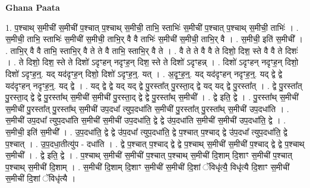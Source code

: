 \documentclass[17pt]{extarticle}
\begin{document}
\textbf{Ghana Paata } \newline

1. प॒श्चाथ् स॒मीची॑ स॒मीची॑ प॒श्चात् प॒श्चाथ् स॒मीची॒ ताभि॒ स्ताभिः॑ स॒मीची॑ प॒श्चात् प॒श्चाथ् स॒मीची॒ ताभिः॑ । . स॒मीची॒ ताभि॒ स्ताभिः॑ स॒मीची॑ स॒मीची॒ ताभि॒र् वै वै ताभिः॑ स॒मीची॑ स॒मीची॒ ताभि॒र् वै । . स॒मीची॒ इति॑ स॒मीची᳚ । . ताभि॒र् वै वै ताभि॒ स्ताभि॒र् वै ते ते वै ताभि॒ स्ताभि॒र् वै ते । . वै ते ते वै वै ते दिशो॒ दिश॒ स्ते वै वै ते दिशः॑ । . ते दिशो॒ दिश॒ स्ते ते दिशो॑ ऽदृꣳहन् नदृꣳह॒न् दिश॒ स्ते ते दिशो॑ ऽदृꣳहन्न् । . दिशो॑ ऽदृꣳहन् नदृꣳह॒न् दिशो॒ दिशो॑ ऽदृꣳह॒न्॒. यद् यद॑दृꣳह॒न् दिशो॒ दिशो॑ ऽदृꣳह॒न्॒. यत् । . अ॒दृꣳ॒॒ह॒न्॒. यद् यद॑दृꣳहन् नदृꣳह॒न्॒. यद् द्वे द्वे यद॑दृꣳहन् नदृꣳह॒न्॒. यद् द्वे । . यद् द्वे द्वे यद् यद् द्वे पु॒रस्ता᳚त् पु॒रस्ता॒द् द्वे यद् यद् द्वे पु॒रस्ता᳚त् । . द्वे पु॒रस्ता᳚त् पु॒रस्ता॒द् द्वे द्वे पु॒रस्ता᳚थ् स॒मीची॑ स॒मीची॑ पु॒रस्ता॒द् द्वे द्वे पु॒रस्ता᳚थ् स॒मीची᳚ । . द्वे इति॒ द्वे । . पु॒रस्ता᳚थ् स॒मीची॑ स॒मीची॑ पु॒रस्ता᳚त् पु॒रस्ता᳚थ् स॒मीची॑ उप॒दधा᳚ त्युप॒दधा॑ति स॒मीची॑ पु॒रस्ता᳚त् पु॒रस्ता᳚थ् स॒मीची॑ उप॒दधा॑ति । . स॒मीची॑ उप॒दधा᳚ त्युप॒दधा॑ति स॒मीची॑ स॒मीची॑ उप॒दधा॑ति॒ द्वे द्वे उ॑प॒दधा॑ति स॒मीची॑ स॒मीची॑ उप॒दधा॑ति॒ द्वे । . स॒मीची॒ इति॑ स॒मीची᳚ । . उ॒प॒दधा॑ति॒ द्वे द्वे उ॑प॒दधा᳚ त्युप॒दधा॑ति॒ द्वे प॒श्चात् प॒श्चाद् द्वे उ॑प॒दधा᳚ त्युप॒दधा॑ति॒ द्वे प॒श्चात् । . उ॒प॒दधा॒तीत्यु॑प - दधा॑ति । . द्वे प॒श्चात् प॒श्चाद् द्वे द्वे प॒श्चाथ् स॒मीची॑ स॒मीची॑ प॒श्चाद् द्वे द्वे प॒श्चाथ् स॒मीची᳚ । . द्वे इति॒ द्वे । . प॒श्चाथ् स॒मीची॑ स॒मीची॑ प॒श्चात् प॒श्चाथ् स॒मीची॑ दि॒शाम् दि॒शाꣳ स॒मीची॑ प॒श्चात् प॒श्चाथ् स॒मीची॑ दि॒शाम् । . स॒मीची॑ दि॒शाम् दि॒शाꣳ स॒मीची॑ स॒मीची॑ दि॒शां ॅविधृ॑त्यै॒ विधृ॑त्यै दि॒शाꣳ स॒मीची॑ स॒मीची॑ दि॒शां ॅविधृ॑त्यै । \newline
\end{document}
